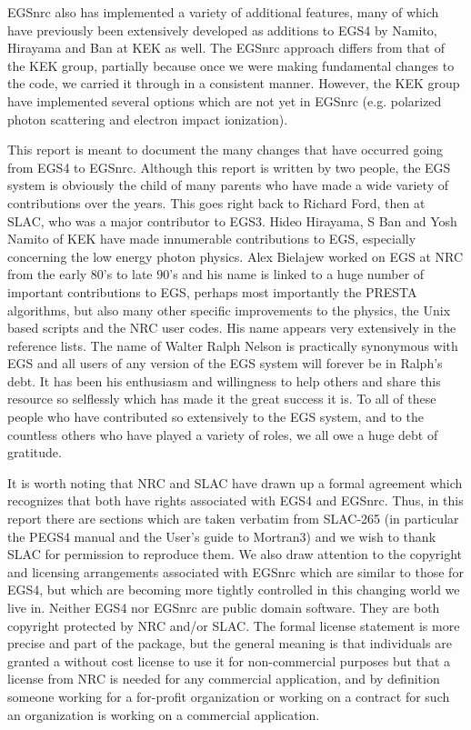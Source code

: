 EGSnrc also has implemented a variety of additional features, many of
which have previously been extensively developed as additions to EGS4
by  Namito, Hirayama and Ban at KEK as well\cite{Na98,Na95a,Na94,Na93}.
The EGSnrc approach differs from that of the KEK group, partially because
once we were making fundamental changes to the code, we carried it through
in a consistent manner. However, the KEK group have implemented several
options which are not yet in EGSnrc (e.g.  polarized photon scattering
and electron impact ionization).
  

This report is meant to document the many changes that have occurred going
from EGS4 to EGSnrc.  Although this report is written by two people,
the EGS system is obviously the child of many parents who have made a
wide variety of contributions over the years.  This goes right back to
Richard Ford, then at SLAC, who was a major contributor to EGS3. Hideo
Hirayama, S Ban  and Yosh Namito of KEK have made innumerable contributions
to EGS, especially concerning the low energy photon physics. Alex
Bielajew worked on EGS at NRC from the early 80's to late 90's and his
name is linked to a huge number of important contributions to EGS,
perhaps most importantly the PRESTA algorithms, but also many other
specific improvements to the physics, the Unix based scripts and the NRC
user codes. His name appears very extensively in the reference lists.
The name of Walter Ralph Nelson is practically synonymous with EGS and
all users of any version of the EGS system will forever be in Ralph's
debt. It has been his enthusiasm and willingness to help others and share
this resource so selflessly which has made it the great success it is.
To all of these people who have contributed so extensively to the EGS
system, and to the countless others who have played a variety of roles,
we all owe a huge debt of gratitude.


It is worth noting that NRC and SLAC have drawn up a formal agreement which
recognizes that both have rights associated with EGS4 and EGSnrc.  Thus, in
this report there are sections which are taken verbatim from SLAC-265 (in
particular the PEGS4 manual and the User's guide to Mortran3) and we wish
to thank SLAC for permission to reproduce them.  We also draw attention to
the copyright and licensing arrangements associated with EGSnrc which are
similar to those for EGS4, but which are becoming more tightly controlled
in this changing world we live in.  Neither EGS4 nor EGSnrc are public
domain software. They are both copyright protected by NRC and/or SLAC. The
formal license statement is more precise and part of the package, but the
general meaning is that individuals are granted a without cost
license to use it for non-commercial purposes but that a license from NRC
is needed for any commercial application, and by definition someone working
for a for-profit organization or working on a contract for such an
organization is working on a commercial application.


